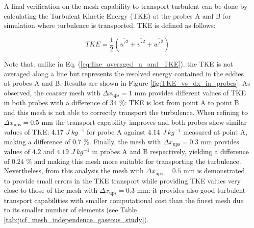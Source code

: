 A final verification on the mesh capability to transport turbulent can be done by calculating the Turbulent Kinetic Energy (TKE) at the probes A and B for simulation where turbulence is transported. TKE is defined as follows:

\begin{equation}
TKE = \frac{1}{2} \left( \overline{u'^2} + \overline{v'^2} + \overline{w'^2} \right)
\end{equation}

Note that, unlike in Eq. (\ref{eq:line_averaged_u_and_TKE}), the TKE is not averaged along a line but represents the resolved energy contained in the eddies at probes A and B. 
Results are shown in Figure \ref{fig:TKE_vs_dx_in_probes}. As observed, the coarser mesh with $\Delta x_\mathrm{ups} = 1$ mm provides different values of TKE in both probes with a difference of 34 $\%$: TKE is lost from point A to point B and this mesh is not able to correctly transport the turbulence. When refining to $\Delta x_\mathrm{ups} = 0.5$ mm the transport capability improves and both probes show similar values of TKE: 4.17 $J ~ kg^{-1}$ for probe A against 4.14 $J ~ kg^{-1}$ measured at point A, making a difference of 0.7 $\%$. Finally, the mesh with $\Delta x_\mathrm{ups} = 0.3$ mm provides values of $4.2$ and $4.19$ $J ~ kg^{-1}$ in probes A and B respectively, yielding a difference of 0.24 $\%$ and making this mesh more suitable for transporting the turbulence. Nevertheless, from this analysis the mesh with $\Delta x_\mathrm{ups} = 0.5$ mm is demonstrated to provide small errors in the TKE transport while providing TKE values very close to those of the mesh with $\Delta x_\mathrm{ups} = 0.3$ mm: it provides also good turbulent transport capabilities with smaller computational cost than the finest mesh due to its smaller number of elements (see Table \ref{tab:jicf_mesh_independence_gaseous_study}). \\

\clearpage

